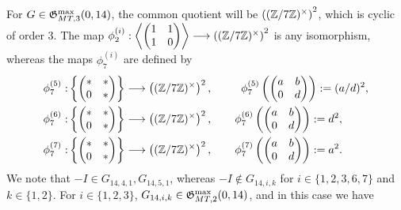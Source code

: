 For $G \in \mathfrak{G}_{MT,3}^{\max}(0,14)$, the common quotient will be $\left( (\mathbb{Z}/7\mathbb{Z})^\times \right)^2$, which is cyclic of order $3$. The map $\phi_2^{(i)} : \left\langle \begin{pmatrix} 1 & 1 \\ 1 & 0 \end{pmatrix} \right\rangle \longrightarrow \left( (\mathbb{Z}/7\mathbb{Z})^\times \right)^2$ is any isomorphism, whereas the maps $\phi_7^{(i)}$ are defined by
\begin{equation} \label{phifiberingmapsmod7}
\begin{split}
\phi_7^{(5)} : &\left\{ \begin{pmatrix} * & * \\ 0 & * \end{pmatrix} \right\} \longrightarrow \left( (\mathbb{Z}/7\mathbb{Z})^\times \right)^2, \quad\quad \;\;\phi_7^{(5)}\left( \begin{pmatrix} a & b \\ 0 & d \end{pmatrix} \right) := (a/d)^2, \\
\phi_7^{(6)} : &\left\{ \begin{pmatrix} * & * \\ 0 & * \end{pmatrix} \right\} \longrightarrow \left( (\mathbb{Z}/7\mathbb{Z})^\times \right)^2, \quad\quad \phi_7^{(6)}\left( \begin{pmatrix} a & b \\ 0 & d \end{pmatrix} \right) := d^2, \\
\phi_7^{(7)} : &\left\{ \begin{pmatrix} * & * \\ 0 & * \end{pmatrix} \right\} \longrightarrow \left( (\mathbb{Z}/7\mathbb{Z})^\times \right)^2, \quad\quad \phi_7^{(7)}\left( \begin{pmatrix} a & b \\ 0 & d \end{pmatrix} \right) := a^2.
\end{split}
\end{equation}
We note that $-I \in G_{14,4,1}, G_{14,5,1}$, whereas $-I \notin G_{14,i,k}$ for $i \in \{1, 2, 3, 6, 7 \}$ and $k \in \{1, 2 \}$. For $i \in \{ 1, 2, 3 \}$, $G_{14,i,k} \in \mathfrak{G}_{MT,2}^{\max}(0,14)$, and in this case we have
